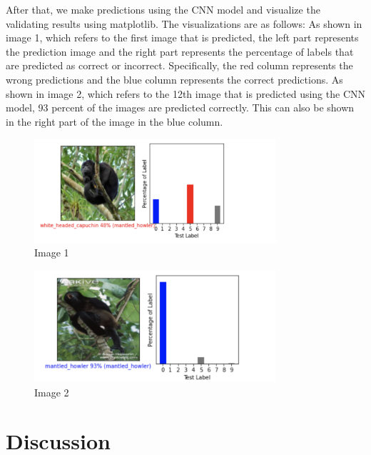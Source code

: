 \documentclass[12pt, letterpaper]{article}
\begin{document}
       After that, we make predictions using the CNN model and visualize the validating results using matplotlib. The visualizations are as follows:
       As shown in image 1, which refers to the first image that is predicted, the left part represents the prediction image and the right part represents the percentage of labels that are predicted as correct or incorrect. Specifically, the red column represents the wrong predictions and the blue column represents the correct predictions. As shown in image 2, which refers to the 12th image that is predicted using the CNN model, 93 percent of the images are predicted correctly. This can also be shown in the right part of the image in the blue column.
    \bigskip
      \begin{figure}[!ht]
       \centering
      \includegraphics[width=0.8\textwidth]{image1.png}
      \caption{\label{fig:image 1}Image 1}
      \end{figure} 
      
      \begin{figure}[!ht]
       \centering
      \includegraphics[width=0.8\textwidth]{image2.png}
      \caption{\label{fig:image 2}Image 2}
      \end{figure} 
    \bigskip
 
\section{Discussion }
\end{document}
